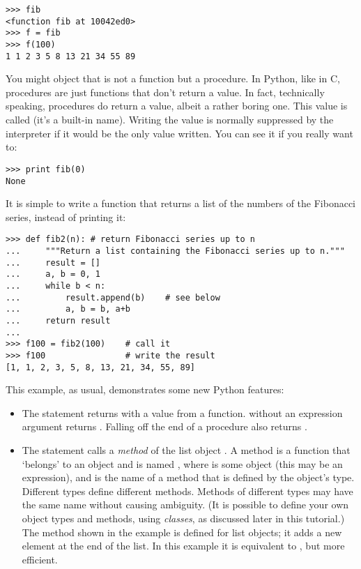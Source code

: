 \documentclass{manual}
\begin{document}
\begin{verbatim}
>>> fib
<function fib at 10042ed0>
>>> f = fib
>>> f(100)
1 1 2 3 5 8 13 21 34 55 89
\end{verbatim}

You might object that  is not a function but a procedure.  In
Python, like in C, procedures are just functions that don't return a
value.  In fact, technically speaking, procedures do return a value,
albeit a rather boring one.  This value is called  (it's a
built-in name).  Writing the value  is normally suppressed by
the interpreter if it would be the only value written.  You can see it
if you really want to:

\begin{verbatim}
>>> print fib(0)
None
\end{verbatim}

It is simple to write a function that returns a list of the numbers of
the Fibonacci series, instead of printing it:

\begin{verbatim}
>>> def fib2(n): # return Fibonacci series up to n
...     """Return a list containing the Fibonacci series up to n."""
...     result = []
...     a, b = 0, 1
...     while b < n:
...         result.append(b)    # see below
...         a, b = b, a+b
...     return result
... 
>>> f100 = fib2(100)    # call it
>>> f100                # write the result
[1, 1, 2, 3, 5, 8, 13, 21, 34, 55, 89]
\end{verbatim}

This example, as usual, demonstrates some new Python features:

\begin{itemize}

\item
The  statement returns with a value from a function.
 without an expression argument returns .
Falling off the end of a procedure also returns .

\item
The statement  calls a \emph{method} of the list
object .  A method is a function that `belongs' to an
object and is named , where  is some
object (this may be an expression), and  is the name
of a method that is defined by the object's type.  Different types
define different methods.  Methods of different types may have the
same name without causing ambiguity.  (It is possible to define your
own object types and methods, using \emph{classes}, as discussed later
in this tutorial.)
The method  shown in the example is defined for
list objects; it adds a new element at the end of the list.  In this
example it is equivalent to , but more
efficient.

\end{itemize}
\end{document}
